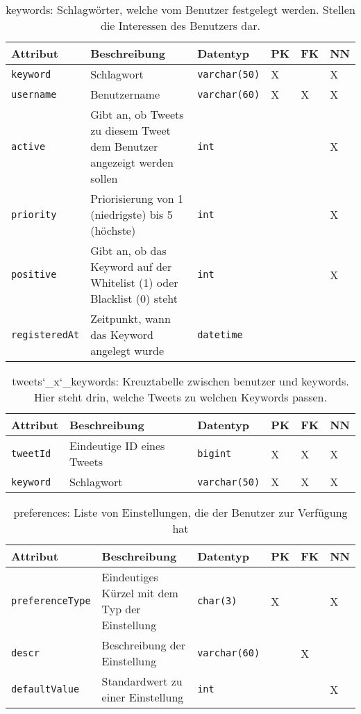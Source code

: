 \begin{table}[!ht]
	\caption{keywords: Schlagwörter, welche vom Benutzer festgelegt werden. Stellen die Interessen des Benutzers dar.}
	\begin{tabular}{p{3cm}p{5cm}p{2cm}p{1cm}p{1cm}p{1cm}}
		\toprule 
		\textbf{Attribut} & \textbf{Beschreibung} & \textbf{Datentyp} & \textbf{PK} & \textbf{FK} & \textbf{NN} \\
		\hline 
		\texttt{keyword} &  Schlagwort  & \texttt{varchar(50)} & X & & X   \\
		\texttt{username} & Benutzername & \texttt{varchar(60)} & X & X & X   \\
		\texttt{active} &  Gibt an, ob Tweets zu diesem Tweet dem Benutzer angezeigt werden sollen & \texttt{int} & & & X   \\
		\texttt{priority} &  Priorisierung von 1 (niedrigste) bis 5 (höchste) & \texttt{int} & & & X  \\
		\texttt{positive} & Gibt an, ob das Keyword auf der Whitelist (1) oder Blacklist (0) steht & \texttt{int} & & & X \\
		\texttt{registeredAt} & Zeitpunkt, wann das Keyword angelegt wurde & \texttt{datetime} & & &   \\
		\bottomrule
	\end{tabular}
\end{table}

\begin{table}[!ht]
	\caption{tweets\char`_x\char`_keywords: Kreuztabelle zwischen benutzer und keywords. Hier steht drin, welche Tweets zu welchen Keywords passen.}
	\begin{tabular}{p{3cm}p{5cm}p{2cm}p{1cm}p{1cm}p{1cm}}
		\toprule 
		\textbf{Attribut} & \textbf{Beschreibung} & \textbf{Datentyp} & \textbf{PK} & \textbf{FK} & \textbf{NN} \\
		\hline 
		\texttt{tweetId} &  Eindeutige ID eines Tweets  & \texttt{bigint} & X & X & X   \\
		\texttt{keyword} & Schlagwort & \texttt{varchar(50)} & X & X & X   \\
		\bottomrule
	\end{tabular}
\end{table}

\begin{table}[!ht]
	\caption{preferences: Liste von Einstellungen, die der Benutzer zur Verfügung hat}
	\begin{tabular}{p{3cm}p{5cm}p{2cm}p{1cm}p{1cm}p{1cm}}
		\toprule 
		\textbf{Attribut} & \textbf{Beschreibung} & \textbf{Datentyp} & \textbf{PK} & \textbf{FK} & \textbf{NN} \\
		\hline 
		\texttt{preferenceType} & Eindeutiges Kürzel mit dem Typ der Einstellung  & \texttt{char(3)} & X & & X   \\
		\texttt{descr} & Beschreibung der Einstellung & \texttt{varchar(60)} &  & X   \\
		\texttt{defaultValue} &  Standardwert zu einer Einstellung & \texttt{int} & & & X   \\
		\bottomrule
	\end{tabular}
\end{table}

